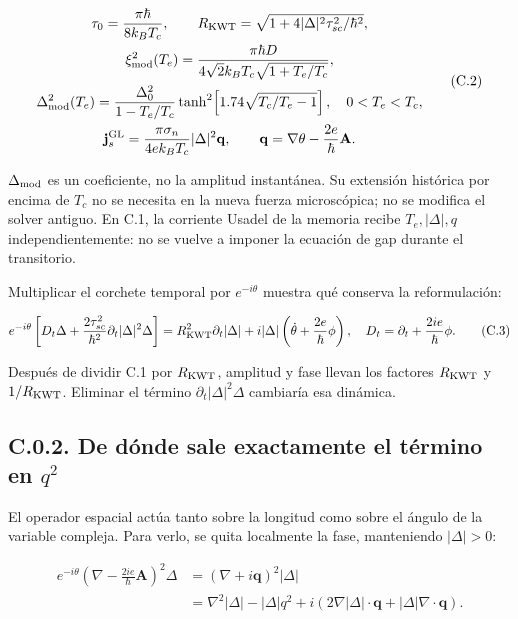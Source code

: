 \documentclass[
  spanish,
  10pt,
  a4paper,
]{article}
\begin{document}
\[
\begin{gathered}
\tau_0=\frac{\pi\hbar}{8k_BT_c},\qquad
R_{\rm KWT}=\sqrt{1+4|\Delta|^2\tau_{sc}^2/\hbar^2},\\
\xi_{\rm mod}^2(T_e)=\frac{\pi\hbar D}{4\sqrt2 k_BT_c\sqrt{1+T_e/T_c}},\\
\Delta_{\rm mod}^2(T_e)=\frac{\Delta_0^2}{1-T_e/T_c}
\tanh^2\!\left[1.74\sqrt{T_c/T_e-1}\right],\quad 0<T_e<T_c,\\
\mathbf j_s^{\rm GL}=\frac{\pi\sigma_n}{4ek_BT_c}|\Delta|^2\mathbf q,
\qquad \mathbf q=\nabla\theta-\frac{2e}{\hbar}\mathbf A.
\end{gathered}\tag{C.2}
\]

\(\Delta_{\rm mod}\) es un coeficiente, no la amplitud instantánea. Su
extensión histórica por encima de \(T_c\) no se necesita en la nueva
fuerza microscópica; no se modifica el solver antiguo. En C.1, la
corriente Usadel de la memoria recibe \(T_e,|\Delta|,q\)
independientemente: no se vuelve a imponer la ecuación de gap durante el
transitorio.

Multiplicar el corchete temporal por \(e^{-i\theta}\) muestra qué
conserva la reformulación:

\[
e^{-i\theta}\left[D_t\Delta+
\frac{2\tau_{sc}^2}{\hbar^2}\partial_t|\Delta|^2\Delta\right]
=R_{\rm KWT}^2\partial_t|\Delta|
+i|\Delta|\left(\dot\theta+\frac{2e}{\hbar}\phi\right),
\quad D_t=\partial_t+\frac{2ie}{\hbar}\phi.
\tag{C.3}
\]

Después de dividir C.1 por \(R_{\rm KWT}\), amplitud y fase llevan los
factores \(R_{\rm KWT}\) y \(1/R_{\rm KWT}\). Eliminar el término
\(\partial_t|\Delta|^2\Delta\) cambiaría esa dinámica.

\subsection{\texorpdfstring{C.0.2. De dónde sale exactamente el término
en
\(q^2\)}{C.0.2. De dónde sale exactamente el término en q\^{}2}}\label{c.0.2.-de-duxf3nde-sale-exactamente-el-tuxe9rmino-en-q2}

El operador espacial actúa tanto sobre la longitud como sobre el ángulo
de la variable compleja. Para verlo, se quita localmente la fase,
manteniendo \(|\Delta|>0\):

\[
\begin{aligned}
e^{-i\theta}\left(\nabla-\frac{2ie}{\hbar}\mathbf A\right)^2\Delta
&=(\nabla+i\mathbf q)^2|\Delta|\\
&=\nabla^2|\Delta|-|\Delta|q^2
+i\left(2\nabla|\Delta|\cdot\mathbf q+|\Delta|\nabla\cdot\mathbf q\right).
\end{aligned}\tag{C.4}
\]
\end{document}
